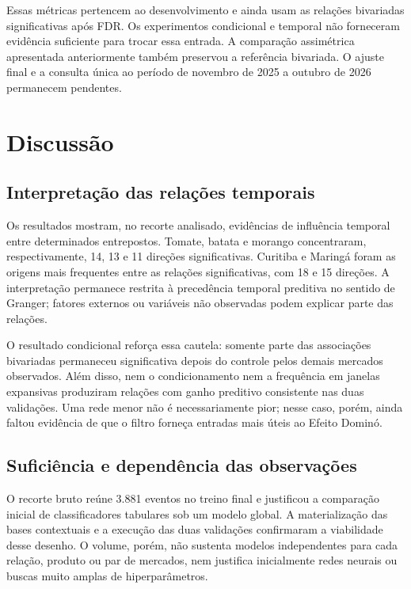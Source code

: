 \documentclass[12pt,a4paper]{article}
\begin{document}
Essas métricas pertencem ao desenvolvimento e ainda usam as relações
bivariadas significativas após FDR. Os experimentos condicional e temporal não
forneceram evidência suficiente para trocar essa entrada. A comparação
assimétrica apresentada anteriormente também preservou a referência bivariada.
O ajuste final e a consulta única ao período de novembro de 2025 a outubro de
2026 permanecem pendentes.


\section{Discussão}

\subsection{Interpretação das relações temporais}

Os resultados mostram, no recorte analisado, evidências de influência temporal
entre determinados entrepostos. Tomate, batata e morango concentraram,
respectivamente, 14, 13 e 11 direções significativas. Curitiba e Maringá foram
as origens mais frequentes entre as relações significativas, com 18 e 15
direções. A interpretação permanece restrita à precedência temporal preditiva
no sentido de Granger; fatores externos ou variáveis não observadas podem
explicar parte das relações.

O resultado condicional reforça essa cautela: somente parte das associações
bivariadas permaneceu significativa depois do controle pelos demais mercados
observados. Além disso, nem o condicionamento nem a frequência em janelas
expansivas produziram relações com ganho preditivo consistente nas duas
validações. Uma rede menor não é necessariamente pior; nesse caso, porém, ainda
faltou evidência de que o filtro forneça entradas mais úteis ao Efeito Dominó.

\subsection{Suficiência e dependência das observações}

O recorte bruto reúne 3.881 eventos no treino final e justificou a comparação
inicial de classificadores tabulares sob um modelo global. A materialização das
bases contextuais e a execução das duas validações confirmaram a viabilidade
desse desenho. O volume, porém, não sustenta modelos independentes para cada
relação, produto ou par de mercados, nem justifica inicialmente redes neurais
ou buscas muito amplas de hiperparâmetros.
\end{document}

